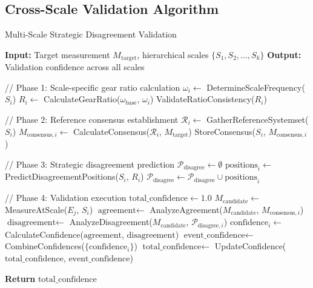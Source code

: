 \documentclass[12pt,a4paper]{article}
\begin{document}
\subsection{Cross-Scale Validation Algorithm}

\begin{algorithm}
\caption{Multi-Scale Strategic Disagreement Validation}
\begin{algorithmic}
\State \textbf{Input:} Target measurement $M_{\text{target}}$, hierarchical scales $\{S_1, S_2, \ldots, S_k\}$
\State \textbf{Output:} Validation confidence across all scales

\State // Phase 1: Scale-specific gear ratio calculation
    \State $\omega_i \leftarrow$ DetermineScaleFrequency($S_i$)
    \State $R_i \leftarrow$ CalculateGearRatio($\omega_{\text{base}}$, $\omega_i$)
    \State ValidateRatioConsistency($R_i$)
\EndFor

\State // Phase 2: Reference consensus establishment
    \State $\mathcal{R}_i \leftarrow$ GatherReferenceSystemset($S_i$)
    \State $M_{\text{consensus},i} \leftarrow$ CalculateConsensus($\mathcal{R}_i$, $M_{\text{target}}$)
    \State StoreConsensus($S_i$, $M_{\text{consensus},i}$)
\EndFor

\State // Phase 3: Strategic disagreement prediction
\State $\mathcal{P}_{\text{disagree}} \leftarrow \emptyset$
    \State $\text{positions}_i \leftarrow$ PredictDisagreementPositions($S_i$, $R_i$)
    \State $\mathcal{P}_{\text{disagree}} \leftarrow \mathcal{P}_{\text{disagree}} \cup \text{positions}_i$
\EndFor

\State // Phase 4: Validation execution
\State $\text{total\_confidence} \leftarrow 1.0$
        \State $M_{\text{candidate}} \leftarrow$ MeasureAtScale($E_j$, $S_i$)
        \State $\text{agreement} \leftarrow$ AnalyzeAgreement($M_{\text{candidate}}$, $M_{\text{consensus},i}$)
        \State $\text{disagreement} \leftarrow$ AnalyzeDisagreement($M_{\text{candidate}}$, $\mathcal{P}_{\text{disagree},i}$)
        \State $\text{confidence}_i \leftarrow$ CalculateConfidence($\text{agreement}$, $\text{disagreement}$)
    \EndFor
    \State $\text{event\_confidence} \leftarrow$ CombineConfidences($\{\text{confidence}_i\}$)
    \State $\text{total\_confidence} \leftarrow$ UpdateConfidence($\text{total\_confidence}$, $\text{event\_confidence}$)
\EndFor

\State \textbf{Return} $\text{total\_confidence}$
\end{algorithmic}
\end{algorithm}
\end{document}
